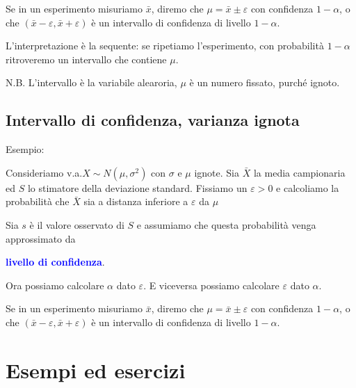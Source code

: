 \documentclass[12pt,openany]{book}
\def\emph#1{\textcolor{blue}{\textbf{\boldmath #1}}}
\def\epsilon{\varepsilon}
\theoremstyle{mio}
\theoremstyle{liscio}
\begin{document}
\ceq{}{=}{\Pr(\bar X-\epsilon<\mu<\bar X+\epsilon)}

Se in un esperimento misuriamo $\bar x$, diremo che $\mu=\bar x\pm\epsilon$ con confidenza $1-\alpha$, o che $(\bar x-\epsilon,\bar x+\epsilon)$ è un intervallo di confidenza di livello $1-\alpha$.

L'interpretazione \`e la sequente: se ripetiamo l'esperimento, con probabilità $1-\alpha$ ritroveremo un intervallo che contiene $\mu$.

N.B. L'intervallo \`e la variabile alearoria, $\mu$ è un numero fissato, purché ignoto. 

\hfill{}\clearpage\section{Intervallo di confidenza, varianza ignota}
\label{IC_varianza_ignota}

Esempio: \hyperref[ICTesempio1]{\faShare}

Consideriamo v.a.\@ $X\sim N(\mu,\sigma^2)$ con $\sigma$ e $\mu$ ignote.  Sia $\bar X$ la media campionaria  ed $S$ lo stimatore della deviazione standard. Fissiamo un $\epsilon>0$ e calcoliamo la probabilità che $\bar X$ sia a distanza inferiore a $\epsilon$ da $\mu$

\ceq{\hfill\Pr(\mu-\epsilon<\bar X<\mu+\epsilon)}{=}{\Pr(-\epsilon<\bar X-\mu<\epsilon)}

\ceq{}{=}{\Pr\bigg(-\frac{\epsilon}{S/\sqrt{n}}<T<\frac{\epsilon}{S/\sqrt{n}}\bigg)}

Sia $s$ è il valore osservato di $S$ e assumiamo che questa probabilità venga approssimato da

\ceq{}{\simeq}{\Pr\bigg(-\frac{\epsilon}{s/\sqrt{n}}<T<\frac{\epsilon}{s/\sqrt{n}}\bigg).}

\hfill \emph{livello di confidenza}.

Ora possiamo calcolare $\alpha$ dato $\epsilon$. E viceversa possiamo calcolare $\epsilon$ dato $\alpha$. 

Se in un esperimento misuriamo $\bar x$, diremo che $\mu=\bar x\pm\epsilon$ con confidenza $1-\alpha$, o che $(\bar x-\epsilon,\bar x+\epsilon)$ è un intervallo di confidenza di livello $1-\alpha$.


\chapter{Esempi ed esercizi}
\label{ch2}
\end{document}
